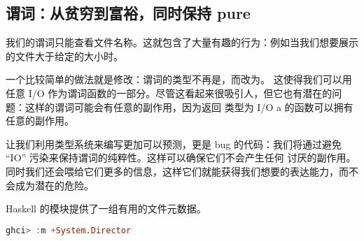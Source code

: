 \documentclass[./main.tex]{subfiles}
\begin{document}
\subsection*{谓词：从贫穷到富裕，同时保持 pure}

我们的谓词只能查看文件名称。这就包含了大量有趣的行为：例如当我们想要展示的文件大于给定的大小时。

一个比较简单的做法就是修改：谓词的类型不再是，而改为。
这使得我们可以用任意 I/O 作为谓词函数的一部分。尽管这看起来很吸引人，但它也有潜在的问题：这样的谓词可能会有任意的副作用，因为返回
类型为 I/O a 的函数可以拥有任意的副作用。

让我们利用类型系统来编写更加可以预测，更是 bug 的代码：我们将通过避免 “IO” 污染来保持谓词的纯粹性。这样可以确保它们不会产生任何
讨厌的副作用。同时我们还会喂给它们更多的信息，这样它们就能获得我们想要的表达能力，而不会成为潜在的危险。

Haskell 的模块提供了一组有用的文件元数据。

\begin{lstlisting}[language=Haskell]
  ghci> :m +System.Director
\end{lstlisting}
\end{document}

